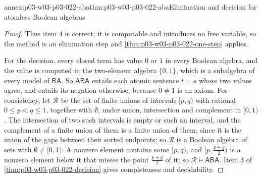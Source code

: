 \begin{annexitem}{annex:p03-w03-p03-022-aba}{thm:p03-w03-p03-022-aba}{Elimination and decision for atomless Boolean algebras}
\begin{proof}
Thus item 4 is correct; it is computable and introduces no free variable,
so the method is an elimination step and
\cref{thm:p03-w03-p03-022-one-step} applies.

For the decision, every closed term has value \(0\) or \(1\) in every
Boolean algebra, and the value is computed in the two-element algebra
\(\{0,1\}\), which is a subalgebra of every model of \(\mathsf{BA}\). So
\(\mathsf{ABA}\) entails each atomic sentence \(t=s\) whose two values agree,
and entails its negation otherwise, because \(0\ne1\) is an axiom. For
consistency, let \(\mathcal R\) be the set of finite unions of intervals
\([p,q)\) with rational \(0\le p<q\le1\), together with \(\emptyset\), under
union, intersection and complement in \([0,1)\). The intersection of two
such intervals is empty or such an interval, and the complement of a finite
union of them is a finite union of them, since it is the union of the gaps
between their sorted endpoints; so \(\mathcal R\) is a Boolean algebra of sets
with \(\emptyset\ne[0,1)\). A nonzero element contains some \([p,q)\), and
\([p,\tfrac{p+q}2)\) is a nonzero element below it that misses the point
\(\tfrac{p+q}2\) of it; so \(\mathcal R\models\mathsf{ABA}\). Item 3 of
\cref{thm:p03-w03-p03-022-decision} gives completeness and decidability.
\end{proof}
\end{annexitem}


